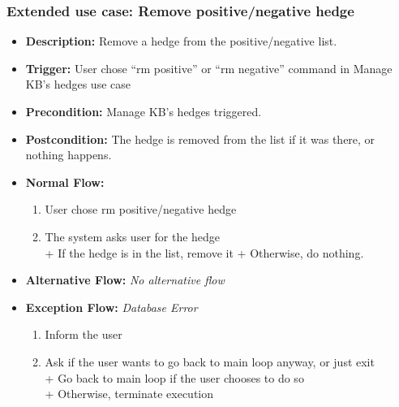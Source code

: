 \documentclass[../gr-final.tex]{subfiles}
\begin{document}
\subsubsection{Extended use case: Remove positive/negative hedge}
\begin{itemize}
  \item {\bfseries Description:} Remove a hedge from the
    positive/negative list. 
  \item {\bfseries Trigger:} User chose ``rm positive'' or
    ``rm negative'' command in
    Manage KB's hedges use case
  \item {\bfseries Precondition:} Manage KB's hedges triggered.
  \item {\bfseries Postcondition:} The hedge is removed from the
    list if it was there, or nothing happens.
  \item {\bfseries Normal Flow:}
    \begin{enumerate}
      \item User chose rm positive/negative hedge 
      \item The system asks user for the hedge\\
        \indent + If the hedge is in the list, remove it 
        \indent + Otherwise, do nothing.
    \end{enumerate}
  \item {\bfseries Alternative Flow:} {\em No alternative flow}
  \item {\bfseries Exception Flow:}
    {\em Database Error}
    \begin{enumerate}
      \item Inform the user
      \item Ask if the user wants to go back to main loop anyway,
        or just exit\\
        \indent + Go back to main loop if the user chooses to do
        so\\
        \indent + Otherwise, terminate execution
    \end{enumerate}
\end{itemize}
\end{document}
